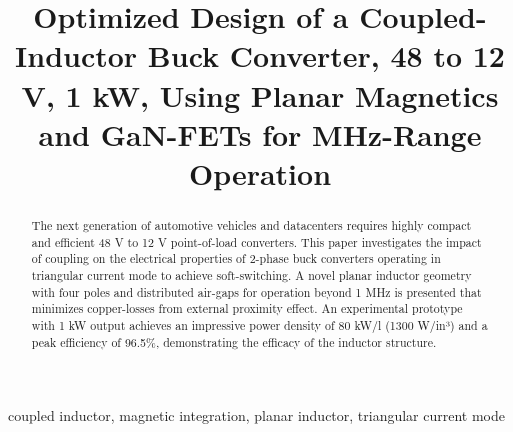\documentclass{IPEC2026}
\begin{document}
\title{Optimized Design of a Coupled-Inductor Buck Converter, 48 to 12 V, 1 kW, Using Planar Magnetics and GaN-FETs for MHz-Range Operation
}


\maketitle

\begin{abstract}
The next generation of automotive vehicles and datacenters requires highly compact and efficient 48 V to 12 V point-of-load converters. This paper investigates the impact of coupling on the electrical properties of 2-phase buck converters operating in triangular current mode to achieve soft-switching. A novel planar inductor geometry with four poles and distributed air-gaps for operation beyond 1 MHz is presented that minimizes copper-losses from external proximity effect. An experimental prototype with 1 kW output achieves an impressive power density of 80 kW/l (1300 W/in³) and a peak efficiency of 96.5\%, demonstrating the efficacy of the inductor structure.
\end{abstract}

\begin{IEEEkeywords}
coupled inductor, magnetic integration, planar inductor, triangular current mode
\end{IEEEkeywords}
\end{document}
